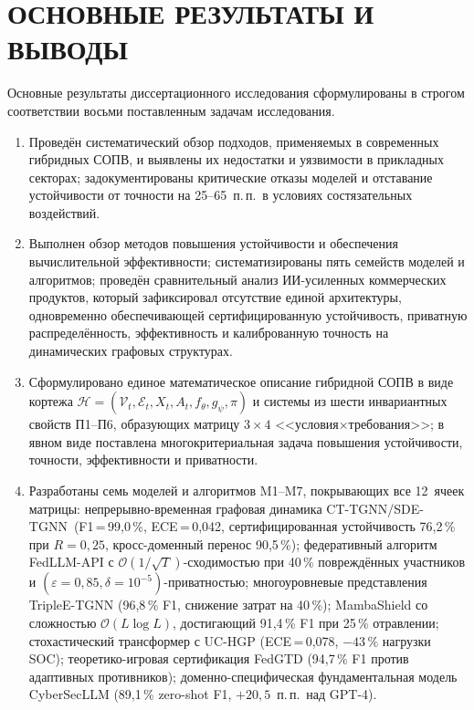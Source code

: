 \documentclass[12pt,a5paper]{article}
\begin{document}
\section*{ОСНОВНЫЕ РЕЗУЛЬТАТЫ И ВЫВОДЫ}

Основные результаты диссертационного исследования
сформулированы в строгом соответствии восьми поставленным
задачам исследования.

\begin{enumerate}
\item Проведён систематический обзор подходов, применяемых в
современных гибридных СОПВ, и выявлены их недостатки и
уязвимости в прикладных секторах; задокументированы
критические отказы моделей и отставание устойчивости от
точности на 25--65~п.\,п.\ в условиях состязательных
воздействий.

\item Выполнен обзор методов повышения устойчивости и
обеспечения вычислительной эффективности; систематизированы
пять семейств моделей и алгоритмов; проведён сравнительный
анализ ИИ-усиленных коммерческих продуктов, который
зафиксировал отсутствие единой архитектуры, одновременно
обеспечивающей сертифицированную устойчивость, приватную
распределённость, эффективность и калиброванную точность
на динамических графовых структурах.

\item Сформулировано единое математическое описание
гибридной СОПВ в виде кортежа $\mathcal{H} = (\mathcal{V}_t,
\mathcal{E}_t, X_t, A_t, f_\theta, g_\psi, \pi)$ и системы
из шести инвариантных свойств П1--П6, образующих матрицу
$3\times4$ <<условия$\times$требования>>; в явном виде
поставлена многокритериальная задача повышения устойчивости,
точности, эффективности и приватности.

\item Разработаны семь моделей и алгоритмов M1--M7,
покрывающих все 12~ячеек матрицы:
непрерывно-временная графовая динамика
CT-TGNN/SDE-TGNN~(F1\,=\,99,0\,\%, ECE\,=\,0,042,
сертифицированная устойчивость 76,2\,\% при
$R{=}0{,}25$, кросс-доменный перенос 90,5\,\%);
федеративный алгоритм FedLLM-API с
$\mathcal{O}(1/\sqrt{T})$-сходимостью при 40\,\%
повреждённых участников
и $(\varepsilon{=}0{,}85,\delta{=}10^{-5})$-приватностью;
многоуровневые представления TripleE-TGNN (96,8\,\% F1,
снижение затрат на 40\,\%); MambaShield со сложностью
$\mathcal{O}(L\log L)$, достигающий 91,4\,\% F1 при
25\,\% отравлении; стохастический трансформер с UC-HGP
(ECE\,=\,0,078, $-43\,\%$ нагрузки SOC);
теоретико-игровая сертификация FedGTD (94,7\,\% F1
против адаптивных противников); доменно-специфическая
фундаментальная модель CyberSecLLM (89,1\,\%
zero-shot F1, $+20{,}5$~п.\,п.\ над GPT-4).


\end{enumerate}
\end{document}

